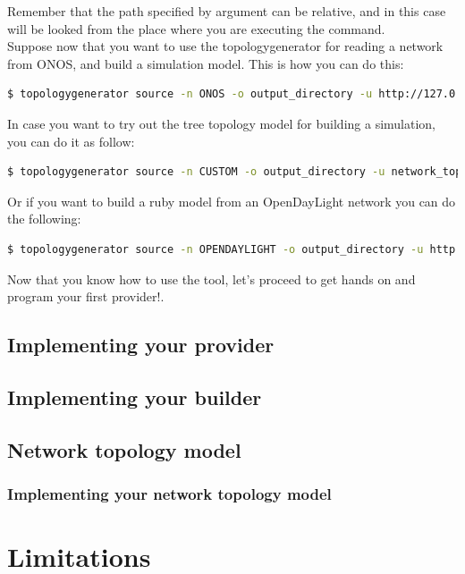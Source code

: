 Remember that the path specified by argument can be relative, and in this case will be looked from the place where you are executing the command.\\

Suppose now that you want to use the topologygenerator for reading a network from ONOS, and build a simulation model. This is how you can do this:

\begin{lstlisting}[language=bash,breaklines=true]
$ topologygenerator source -n ONOS -o output_directory -u http://127.0.0.1/onos/v1/ -d builders_examples/pdm_builders
\end{lstlisting}

In case you want to try out the tree topology model for building a simulation, you can do it as follow:

\begin{lstlisting}[language=bash,breaklines=true]
$ topologygenerator source -n CUSTOM -o output_directory -u network_topologies_examples/tree_topology.rb -d builders_examples/pdm_builders
\end{lstlisting}

Or if you want to build a ruby model from an OpenDayLight network you can do the following:

\begin{lstlisting}[language=bash,breaklines=true]
$ topologygenerator source -n OPENDAYLIGHT -o output_directory -u http://localhost:8080/restconf/operational/network-topology:network-topology/topology/flow:1/ -d builders_examples/ruby_builders
\end{lstlisting}

Now that you know how to use the tool, let's proceed to get hands on and program your first provider!.

\subsection{Implementing your provider}

\subsection{Implementing your builder}

\subsection{Network topology model}

\subsubsection{Implementing your network topology model}



\section{Limitations}